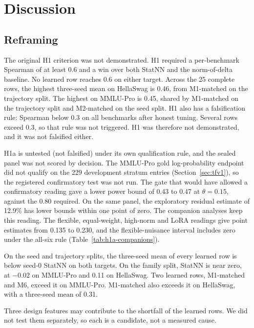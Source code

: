 \section{Discussion}
\subsection{Reframing}
\label{sec:reframing}
The original H1 criterion was not demonstrated. H1 required a per-benchmark Spearman of at least 0.6 and a win over both StatNN and the norm-of-delta baseline. No learned row reaches 0.6 on either target. Across the 25 complete rows, the highest three-seed mean on HellaSwag is 0.46, from M1-matched on the trajectory split. The highest on MMLU-Pro is 0.45, shared by M1-matched on the trajectory split and M2-matched on the seed split. H1 also has a falsification rule: Spearman below 0.3 on all benchmarks after honest tuning. Several rows exceed 0.3, so that rule was not triggered. H1 was therefore not demonstrated, and it was not falsified either.

H1a is untested (not falsified) under its own qualification rule, and the sealed panel was not scored by decision. The MMLU-Pro gold log-probability endpoint did not qualify on the 229 development stratum entries (Section~\ref{sec:tfv1}), so the registered confirmatory test was not run. The gate that would have allowed a confirmatory reading gave a lower power bound of 0.43 to 0.47 at $\theta = 0.15$, against the 0.80 required. On the same panel, the exploratory residual estimate of 12.9\% has lower bounds within one point of zero. %
The companion analyses keep this reading. The flexible, equal-weight, high-norm and LoRA readings give point estimates from 0.135 to 0.230, and the flexible-nuisance interval includes zero under the all-six rule (Table~\ref{tab:h1a-companions}).

On the seed and trajectory splits, the three-seed mean of every learned row is below seed-0 StatNN on both targets. On the family split, StatNN is near zero, at $-$0.02 on MMLU-Pro and 0.11 on HellaSwag. Two learned rows, M1-matched and M6, exceed it on MMLU-Pro. M1-matched also exceeds it on HellaSwag, with a three-seed mean of 0.31.

Three design features may contribute to the shortfall of the learned rows. We did not test them separately, so each is a candidate, not a measured cause.

